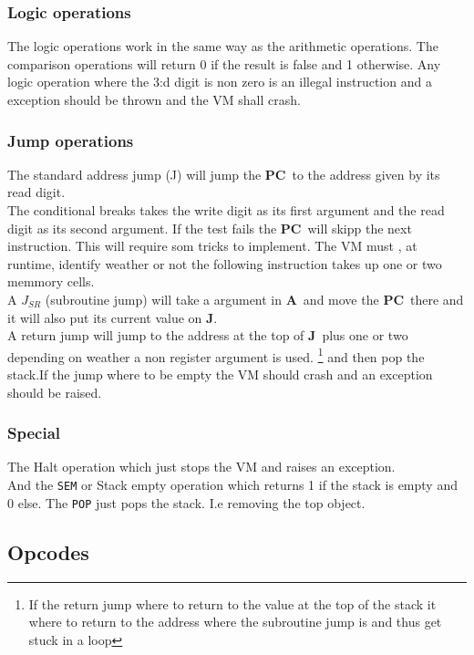 \documentclass{article}
\newcommand{\A}{$\textbf{A}$}
\newcommand{\pc}{$\textbf{PC}$}
\newcommand{\J}{$\textbf{J}$}
\newcommand{\V}{\verb}
\begin{document}
\subsubsection{Logic operations}
The logic operations work in the same way as the arithmetic operations. The
comparison operations will return 0 if the result is false and 1 otherwise.
Any logic operation where the 3:d digit is non zero is an illegal instruction
and a exception should be thrown and the VM shall crash.

\subsubsection{Jump operations}
The standard address jump (J) will jump the \pc \ to the address given by its
read digit.\\
The conditional breaks takes the write digit as its first argument and the read
digit as its second argument. If the test fails the \pc \ will skipp the next
instruction. This will require som tricks to implement. The VM must , at
runtime, identify weather or not the following instruction takes up one or two
memmory cells.\\

A $J_{SR}$ (subroutine jump) will take a argument in \A \ and move the \pc \
there and it will also put its current value on \J.\\
A return jump will jump to the address at the top of \J \ plus one or two
depending on weather a non register argument is used.
 \footnote{If the return jump where to return to the value at the top of the
 stack it where to return to the address where the subroutine jump is and thus 
 get stuck in a loop} and then pop the stack.If the jump where to be empty the 
 VM should crash and an exception should be raised.\\


\subsubsection{Special}
The Halt operation which just stops the VM and
raises an exception.\\
And the \V+SEM+ or Stack empty operation which returns 1 if the stack is empty
and 0 else.
The \V+POP+ just pops the stack. I.e removing the top object.

\subsection{Opcodes}
\end{document}
